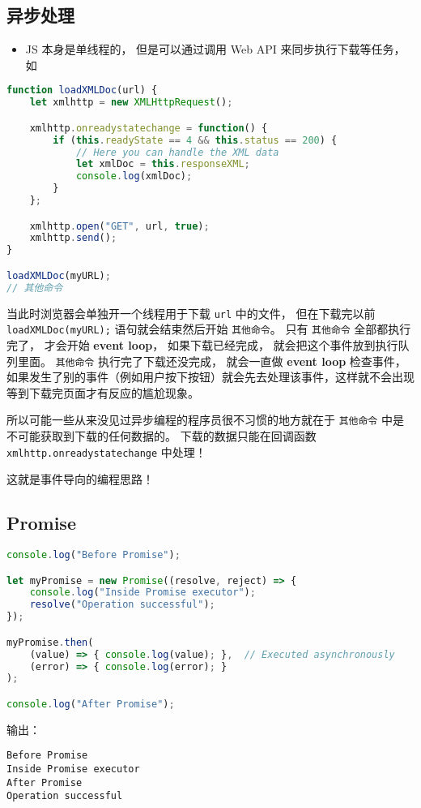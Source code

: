 
\begin{issues}
\issueDraft
\end{issues}


\subsection{异步处理}
\begin{itemize}
\item JS 本身是单线程的， 但是可以通过调用 Web API 来同步执行下载等任务， 如
\end{itemize}
\begin{lstlisting}[language=js]
function loadXMLDoc(url) {
    let xmlhttp = new XMLHttpRequest();

    xmlhttp.onreadystatechange = function() {
        if (this.readyState == 4 && this.status == 200) {
            // Here you can handle the XML data
            let xmlDoc = this.responseXML;
            console.log(xmlDoc);
        }
    };

    xmlhttp.open("GET", url, true);
    xmlhttp.send();
}

loadXMLDoc(myURL);
// 其他命令
\end{lstlisting}
当此时浏览器会单独开一个线程用于下载 \verb`url` 中的文件， 但在下载完以前 \verb`loadXMLDoc(myURL);` 语句就会结束然后开始 \verb`其他命令`。 只有 \verb`其他命令` 全部都执行完了， 才会开始 \textbf{event loop}， 如果下载已经完成， 就会把这个事件放到执行队列里面。 \verb`其他命令` 执行完了下载还没完成， 就会一直做 \textbf{event loop} 检查事件， 如果发生了别的事件（例如用户按下按钮）就会先去处理该事件，这样就不会出现等到下载完页面才有反应的尴尬现象。

所以可能一些从来没见过异步编程的程序员很不习惯的地方就在于 \verb`其他命令` 中是不可能获取到下载的任何数据的。 下载的数据只能在回调函数 \verb`xmlhttp.onreadystatechange` 中处理！

这就是事件导向的编程思路！

\subsection{Promise}
\begin{lstlisting}[language=js]
console.log("Before Promise");

let myPromise = new Promise((resolve, reject) => {
    console.log("Inside Promise executor");
    resolve("Operation successful");
});

myPromise.then(
    (value) => { console.log(value); },  // Executed asynchronously
    (error) => { console.log(error); }
);

console.log("After Promise");
\end{lstlisting}
输出：
\begin{lstlisting}[language=none]
Before Promise
Inside Promise executor
After Promise
Operation successful
\end{lstlisting}

